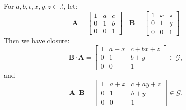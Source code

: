 \documentclass[11pt]{article}
\newcommand{\R}{\mathbb{R}}
\newcommand{\G}{\mathcal{G}}
\theoremstyle{definition}
\theoremstyle{plain}
\theoremstyle{remark}
\begin{document}
\begin{enumerate}
          For \(a, b, c, x, y, z \in \R\), let:
          \[
              \mathbf{A} =
              \begin{bmatrix}
                  1 & a & c \\
                  0 & 1 & b \\
                  0 & 0 & 1
              \end{bmatrix}
              \quad
              \mathbf{B} =
              \begin{bmatrix}
                  1 & x & z \\
                  0 & 1 & y \\
                  0 & 0 & 1
              \end{bmatrix}
          \]
          Then we have closure:
          \[
              \mathbf{B} \cdot \mathbf{A} =
              \begin{bmatrix}
                  1 & a + x & c + bx + z \\
                  0 & 1     & b + y      \\
                  0 & 0     & 1
              \end{bmatrix}
              \in \G,
          \]
          and
          \[
              \mathbf{A} \cdot \mathbf{B} =
              \begin{bmatrix}
                  1 & a + x & c + ay + z \\
                  0 & 1     & b + y      \\
                  0 & 0     & 1
              \end{bmatrix}
              \in \G.
          \]


\end{enumerate}
\end{document}
